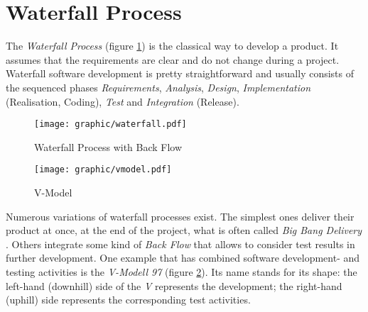 %
%
%
%
%
%
%

\section{Waterfall Process}
\label{waterfall_process_heading}

The \emph{Waterfall Process} (figure \ref{waterfall_figure}) is the classical
way to develop a product. It assumes that the requirements are clear and do not
change during a project. Waterfall software development is pretty straightforward
and usually consists of the sequenced phases \emph{Requirements}, \emph{Analysis},
\emph{Design}, \emph{Implementation} (Realisation, Coding), \emph{Test} and
\emph{Integration} (Release).

\begin{figure}[ht]
    \begin{center}
        \texttt{[image: graphic/waterfall.pdf]}
        \caption{Waterfall Process with Back Flow}
        \label{waterfall_figure}
    \end{center}
\end{figure}

\begin{figure}[ht]
    \begin{center}
        \texttt{[image: graphic/vmodel.pdf]}
        \caption{V-Model}
        \label{vmodel_figure}
    \end{center}
\end{figure}

Numerous variations of waterfall processes exist. The simplest ones deliver
their product at once, at the end of the project, what is often called
\emph{Big Bang Delivery} \cite{malotaux}. Others integrate some kind of
\emph{Back Flow} \cite{sweedyk} that allows to consider test results in further
development. One example that has combined software development- and testing
activities is the \emph{V-Modell 97} \cite{vmodel} (figure \ref{vmodel_figure}).
Its name stands for its shape: the left-hand (downhill) side of the \emph{V}
represents the development; the right-hand (uphill) side represents the
corresponding test activities.
